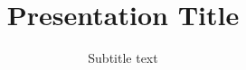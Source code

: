 \documentclass{beamer}
\title{Presentation Title}
\subtitle{Subtitle text}
\begin{document}
\frame{\titlepage}
\end{document}
